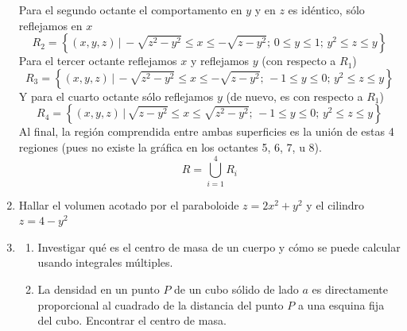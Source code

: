\documentclass{article}
\begin{document}
\begin{enumerate}
{        Para el segundo octante el comportamento en $y$ y en $z$ es idéntico, sólo reflejamos en $x$
        \[
            R_2=\left\{
                    (x,y,z)\,\big\vert\,
                    -\sqrt{z^2-y^2}\leq x\leq-\sqrt{z-y^2};\,
                    0\leq y\leq 1;\,
                    y^2\leq z\leq y
                \right\}
        \]
        Para el tercer octante reflejamos $x$ y reflejamos $y$ (con respecto a $R_1$)
        \[
            R_3=\left\{
                    (x,y,z)\,\big\vert\,
                    -\sqrt{z^2-y^2}\leq x\leq-\sqrt{z-y^2};\,
                    -1\leq y\leq 0;\,
                    y^2\leq z\leq y
                \right\}
        \]
        Y para el cuarto octante sólo reflejamos $y$ (de nuevo, es con respecto a $R_1$)
        \[
            R_4=\left\{
                    (x,y,z)\,\big\vert\,
                    \sqrt{z-y^2}\leq x\leq\sqrt{z^2-y^2};\,
                    -1\leq y\leq 0;\,
                    y^2\leq z\leq y
                \right\}
        \]
        Al final, la región comprendida entre ambas superficies es la unión de estas 4 regiones (pues no existe la gráfica en los octantes 5, 6, 7, u 8).
        \[
            R=\bigcup_{i=1}^4{R_i}
        \]
    }
    
   \item {
   Hallar el volumen acotado por el paraboloide $z = 2x^2 + y^2$ y el cilindro $z = 4 - y^2$\\

	
    }
    
   \item {
    \begin{enumerate}
	\item
	Investigar qué es el centro de masa de un cuerpo y cómo se puede calcular usando integrales múltiples.\\	
	
	
	\item    
	La densidad en un punto $P$ de un cubo sólido de lado $a$ es directamente proporcional al cuadrado de la distancia del punto $P$ a una esquina fija del cubo. Encontrar el centro de masa.\\    
    
    \end{enumerate}
    }
    
\end{enumerate}
\end{document}
